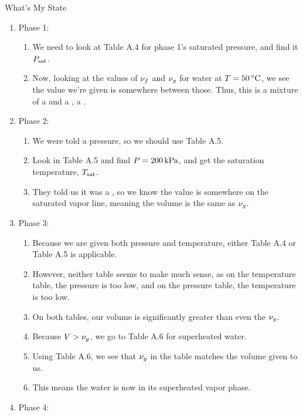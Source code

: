\begin{example}[Problem 4.23]{What's My State}
  \begin{enumerate}[noitemsep]
  \item Phase 1:
    \begin{enumerate}[noitemsep]
    \item We need to look at Table A.4 for phase 1's saturated pressure, and find it $P_{\mathrm{sat}}$.
    \item Now, looking at the values of $\nu_{f}$ and $\nu_{g}$ for water at $\Temp = \SI{50}{\degreeCelsius}$, we see the value we're given is somewhere between those.
      Thus, this is a mixture of a  and a , a .
    \end{enumerate}
  \item Phase 2:
    \begin{enumerate}[noitemsep]
    \item We were told a pressure, so we should use Table A.5.
    \item Look in Table A.5 and find $P = \SI{200}{\kilo\pascal}$, and get the saturation temperature, $T_{\mathrm{sat}}$.
    \item They told us it was a , so we know the value is somewhere on the saturated vapor line, meaning the volume is the same as $\nu_{g}$.
    \end{enumerate}
  \item Phase 3:
    \begin{enumerate}[noitemsep]
    \item Because we are given both pressure and temperature, either Table A.4 or Table A.5 is applicable.
    \item However, neither table seems to make much sense, as on the temperature table, the pressure is too low, and on the pressure table, the temperature is too low.
    \item On both tables, our volume is significantly greater than even the $\nu_{g}$.
    \item Because $V > \nu_{g}$, we go to Table A.6 for superheated water.
    \item Using Table A.6, we see that $\nu_{g}$ in the table matches the volume given to us.
    \item This means the water is now in its superheated vapor phase.
    \end{enumerate}
  \item Phase 4:

\end{enumerate}
\end{example}
